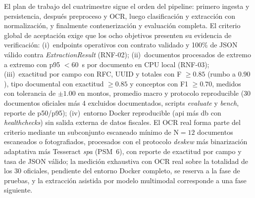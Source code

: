 El plan de trabajo del cuatrimestre sigue el orden del pipeline: primero ingesta y persistencia, despu\'es preproceso y OCR, luego clasificaci\'on y extracci\'on con normalizaci\'on, y finalmente contenerizaci\'on y evaluaci\'on completa. El criterio global de aceptaci\'on exige que los ocho objetivos presenten su evidencia de verificaci\'on: (i)~endpoints operativos con contrato validado y 100\% de JSON v\'alido contra \textit{ExtractionResult} (RNF-02); (ii)~documentos procesados de extremo a extremo con p95 $< 60$~s por documento en CPU local (RNF-03); (iii)~exactitud por campo con RFC, UUID y totales con F $\geq 0.85$ (rumbo a $0.90$), tipo documental con exactitud $\geq 0.85$ y conceptos con F1 $\geq 0.70$, medidos con tolerancia de $\pm 1.00$ en montos, promedio macro y protocolo reproducible (30 documentos oficiales m\'as 4 excluidos documentados, scripts \textit{evaluate} y \textit{bench}, reporte de p50/p95); (iv)~entorno Docker reproducible (api m\'as db con \textit{healthchecks}) sin salida externa de datos fiscales\cite{structured_extraction_2023, docker_docs, sokolova_metrics_2009}. El OCR real forma parte del criterio mediante un subconjunto escaneado m\'inimo de N${=}12$ documentos escaneados o fotografiados, procesados con el protocolo \textit{deskew} m\'as binarizaci\'on adaptativa m\'as Tesseract \textit{spa} (PSM~6), con reporte de exactitud por campo y tasa de JSON v\'alido; la medici\'on exhaustiva con OCR real sobre la totalidad de los 30 oficiales, pendiente del entorno Docker completo, se reserva a la fase de pruebas, y la extracci\'on asistida por modelo multimodal corresponde a una fase siguiente\cite{kim_donut_2022, tesseract_ocr}.

